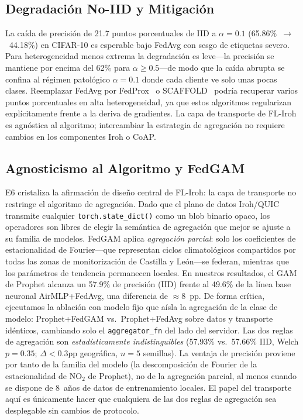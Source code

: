 \documentclass[journal]{IEEEtran}
\begin{document}
\subsection{Degradación No-IID y Mitigación}

La caída de precisión de 21.7 puntos porcentuales de IID a $\alpha{=}0.1$ (65.86\%~$\to$~44.18\%) en CIFAR-10 es esperable bajo FedAvg con sesgo de etiquetas severo. Para heterogeneidad menos extrema la degradación es leve---la precisión se mantiene por encima del 62\% para $\alpha{\geq}0.5$---de modo que la caída abrupta se confina al régimen patológico $\alpha{=}0.1$ donde cada cliente ve solo unas pocas clases. Reemplazar FedAvg por FedProx~\cite{fedprox2020} o SCAFFOLD~\cite{scaffold2020} podría recuperar varios puntos porcentuales en alta heterogeneidad, ya que estos algoritmos regularizan explícitamente frente a la deriva de gradientes. La capa de transporte de FL-Iroh es agnóstica al algoritmo; intercambiar la estrategia de agregación no requiere cambios en los componentes Iroh o CoAP.

\subsection{Agnosticismo al Algoritmo y FedGAM}

E6 cristaliza la afirmación de diseño central de FL-Iroh: la capa de transporte no restringe el algoritmo de agregación. Dado que el plano de datos Iroh/QUIC transmite cualquier \texttt{torch.state\_dict()} como un blob binario opaco, los operadores son libres de elegir la semántica de agregación que mejor se ajuste a su familia de modelos. FedGAM aplica \emph{agregación parcial}: solo los coeficientes de estacionalidad de Fourier---que representan ciclos climatológicos compartidos por todas las zonas de monitorización de Castilla y Le\'on---se federan, mientras que los parámetros de tendencia permanecen locales. En nuestros resultados, el GAM de Prophet alcanza un 57.9\% de precisión (IID) frente al 49.6\% de la línea base neuronal AirMLP+FedAvg, una diferencia de $\approx$8~pp. De forma crítica, ejecutamos la ablación con modelo fijo que aísla la agregación de la clase de modelo: Prophet+FedGAM vs.~Prophet+FedAvg sobre datos y transporte idénticos, cambiando solo el \texttt{aggregator\_fn} del lado del servidor. Las dos reglas de agregación son \emph{estadísticamente indistinguibles} (57.93\% vs.~57.66\% IID, Welch $p{=}0.35$; $\Delta{<}0.3$pp geográfica, $n{=}5$ semillas). La ventaja de precisión proviene por tanto de la familia del modelo (la descomposición de Fourier de la estacionalidad de NO$_2$ de Prophet), no de la agregación parcial, al menos cuando se dispone de 8~años de datos de entrenamiento locales. El papel del transporte aquí es únicamente hacer que cualquiera de las dos reglas de agregación sea desplegable sin cambios de protocolo.
\end{document}
